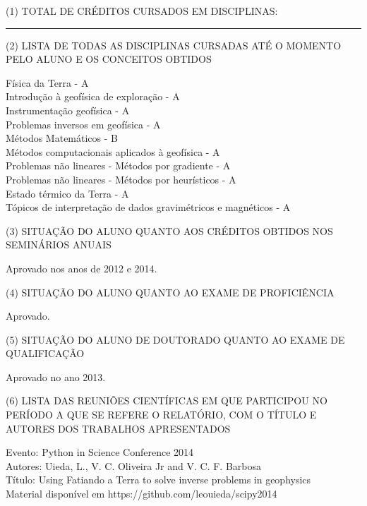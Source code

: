 \documentclass[12pt,a4paper]{article}
\begin{document}
\vspace{1cm}

\begin{flushleft}

\noindent (1) TOTAL DE CRÉDITOS CURSADOS EM DISCIPLINAS: \rule{2cm}{0.4pt}

\bigskip

\noindent (2) LISTA DE TODAS AS DISCIPLINAS CURSADAS ATÉ O MOMENTO PELO ALUNO
E OS CONCEITOS OBTIDOS

\bigskip

Física da Terra - A\\
Introdução à geofísica de exploração - A\\
Instrumentação geofísica - A\\
Problemas inversos em geofísica - A\\
Métodos Matemáticos - B\\
Métodos computacionais aplicados à geofísica - A\\
Problemas não lineares - Métodos por gradiente - A\\
Problemas não lineares - Métodos por heurísticos - A\\
Estado térmico da Terra - A\\
Tópicos de interpretação de dados gravimétricos e magnéticos - A

\bigskip

\noindent (3) SITUAÇÃO DO ALUNO QUANTO AOS CRÉDITOS OBTIDOS NOS SEMINÁRIOS
ANUAIS

\bigskip

Aprovado nos anos de 2012 e 2014.

\bigskip

\noindent (4) SITUAÇÃO DO ALUNO QUANTO AO EXAME DE PROFICIÊNCIA

\bigskip

Aprovado.

\bigskip

\noindent (5) SITUAÇÃO DO ALUNO DE DOUTORADO QUANTO AO EXAME DE QUALIFICAÇÃO

\bigskip

Aprovado no ano 2013.

\bigskip

\noindent (6) LISTA DAS REUNIÕES CIENTÍFICAS EM QUE PARTICIPOU NO PERÍODO A QUE
SE REFERE O RELATÓRIO, COM O TÍTULO E AUTORES DOS TRABALHOS APRESENTADOS

\bigskip

Evento: Python in Science Conference 2014\\
Autores: Uieda, L., V. C. Oliveira Jr and V. C. F. Barbosa\\
Título: Using Fatiando a Terra to solve inverse problems in geophysics\\
Material disponível em https://github.com/leouieda/scipy2014


\end{flushleft}
\end{document}
